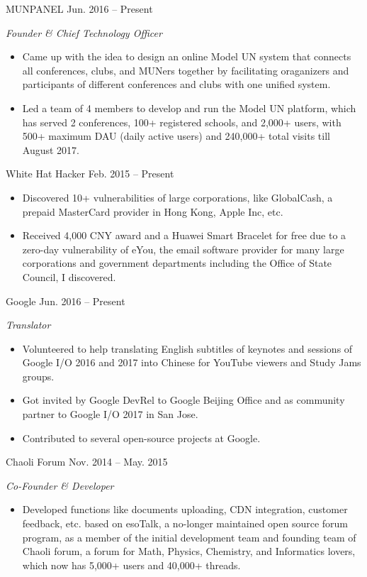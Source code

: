 \documentclass[hidelinks]{adamyi-cv} %
\begin{document}
\begin{entrylist}


\entry
{MUNPANEL}
{Jun. 2016 -- Present}
{\emph{Founder \& Chief Technology Officer}
\begin{itemize}
\item Came up with the idea to design an online Model UN system that connects all conferences, clubs, and MUNers together by facilitating oraganizers and participants of different conferences and clubs with one unified system.
\item Led a team of 4 members to develop and run the Model UN platform, which has served 2 conferences, 100+ registered schools, and 2,000+ users, with 500+ maximum DAU (daily active users) and 240,000+ total visits till August 2017.
\end{itemize}}


\entry
{White Hat Hacker}
{Feb. 2015 -- Present}
{\begin{itemize}
\item Discovered 10+ vulnerabilities of large corporations, like GlobalCash, a prepaid MasterCard provider in Hong Kong, Apple Inc, etc.
\item Received 4,000 CNY award and a Huawei Smart Bracelet for free due to a zero-day vulnerability of eYou, the email software provider for many large corporations and government departments including the Office of State Council, I discovered.
\end{itemize}}


\entry
{Google}
{Jun. 2016 -- Present}
{\emph{Translator}
\begin{itemize}
\item Volunteered to help translating English subtitles of keynotes and sessions of Google I/O 2016 and 2017 into Chinese for YouTube viewers and Study Jams groups.
\item Got invited by Google DevRel to Google Beijing Office and as community partner to Google I/O 2017 in San Jose.
\item Contributed to several open-source projects at Google.
\end{itemize}}


\entry
{Chaoli Forum}
{Nov. 2014 -- May. 2015}
{\emph{Co-Founder \& Developer}
\begin{itemize}
\item Developed functions like documents uploading, CDN integration, customer feedback, etc. based on esoTalk, a no-longer maintained open source forum program, as a member of the initial development team and founding team of Chaoli forum, a forum for Math, Physics, Chemistry, and Informatics lovers, which now has 5,000+ users and 40,000+ threads.
\end{itemize}}


\end{entrylist}
\end{document}
